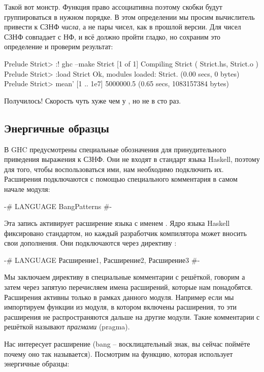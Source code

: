 Такой вот монстр. Функция  право ассоциативна поэтому скобки
будут группироваться в нужном порядке. В этом определении мы просим
вычислитель привести к СЗНФ \emph{числа}, а не пары чисел, как в прошлой
версии. Для чисел СЗНФ совпадает с НФ, и всё должно пройти гладко, но
сохраним это определение и проверим результат:


\begin{code}
Prelude Strict> :! ghc --make Strict
[1 of 1] Compiling Strict           ( Strict.hs, Strict.o )
Prelude Strict> :load Strict
Ok, modules loaded: Strict.
(0.00 secs, 0 bytes)
Prelude Strict> mean' [1 .. 1e7]
5000000.5
(0.65 secs, 1083157384 bytes)
\end{code}

Получилось! Скорость чуть хуже чем у , но не в сто раз.

\subsection{Энергичные образцы}

В GHC предусмотрены специальные обозначения для принудительного
приведения выражения к СЗНФ. Они не входят в стандарт языка Haskell,
поэтому для того, чтобы воспользоваться ими, нам необходимо подключить
их. Расширения подключаются с помощью специального комментария в самом
начале модуля:


\begin{code}
{-# LANGUAGE BangPatterns #-}
\end{code}

Эта запись активирует расширение языка с именем . Ядро
языка Haskell фиксировано стандартом, но каждый разработчик компилятора
может вносить свои дополнения. Они подключаются через директиву
:


\begin{code}
{-# LANGUAGE 
        Расширение1, 
        Расширение2, 
        Расширение3 #-}
\end{code}

Мы заключаем директиву в специальные комментарии с решёткой, говорим
 а затем через запятую перечисляем имена расширений,
которые нам понадобятся. Расширения активны только в рамках данного
модуля. Например если мы импортируем функции из модуля, в котором
включены расширения, то эти расширения не распространяются дальше на
другие модули. Такие комментарии с решёткой называют \emph{прагмами}
(pragma).

Нас интересует расширение  (bang -- восклицательный
знак, вы сейчас поймёте почему оно так называется). Посмотрим на
функцию, которая использует энергичные образцы:


